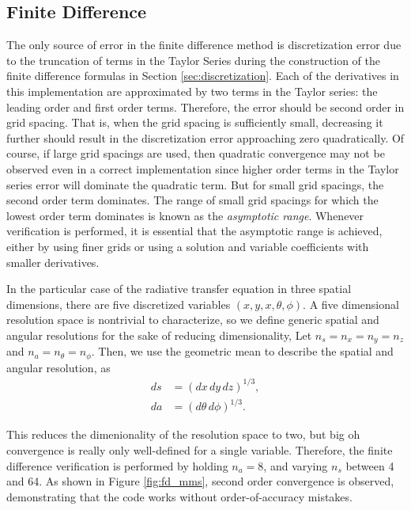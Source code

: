 \subsection{Finite Difference}

The only source of error in the finite difference method is discretization error due to the truncation of terms in the Taylor Series during the construction of the finite difference formulas in Section \ref{sec:discretization}.
Each of the derivatives in this implementation are approximated by two terms in the Taylor series: the leading order and first order terms.
Therefore, the error should be second order in grid spacing.
That is, when the grid spacing is sufficiently small, decreasing it further should result in the discretization error approaching zero quadratically.
Of course, if large grid spacings are used, then quadratic convergence may not be observed even in a correct implementation since higher order terms in the Taylor series error will dominate the quadratic term.
But for small grid spacings, the second order term dominates.
The range of small grid spacings for which the lowest order term dominates is known as the \textit{asymptotic range}.
Whenever verification is performed, it is essential that the asymptotic range is achieved, either by using finer grids or using a solution and variable coefficients with smaller derivatives.

In the particular case of the radiative transfer equation in three spatial dimensions,
there are five discretized variables $(x,y,x,\theta,\phi)$.
A five dimensional resolution space is nontrivial to characterize, so we define generic spatial and angular resolutions for the sake of reducing dimensionality,
Let $n_s = n_x = n_y = n_z$ and $n_a = n_\theta = n_\phi$.
Then, we use the geometric mean to describe the spatial and angular resolution, as
\begin{align}
  ds &= (dx\, dy\, dz)^{1/3}, \\
  da &= (d\theta\, d\phi)^{1/3}.
\end{align}

This reduces the dimenionality of the resolution space to two, but big oh convergence is really only well-defined for a single variable.
Therefore, the finite difference verification is performed by holding $n_a=8$, and varying $n_s$ between 4 and 64.
As shown in Figure \ref{fig:fd_mms}, second order convergence is observed, demonstrating that the code works without order-of-accuracy mistakes.

